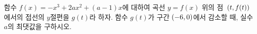 함수 $f(x)=-x^3+2ax^2+(a-1)x$에 대하여 곡선 $y=f(x)$ 위의 점~$(t{,}\mkern3mu\mathopen{}f(t))$에서의 접선의 $y$절편을 $g(t)$라 하자. 함수 $g(t)$가 구간 $(-6{,}\mkern3mu\mathopen{}0)$에서 감소할 때, 실수 $a$의 최댓값을 구하시오.
